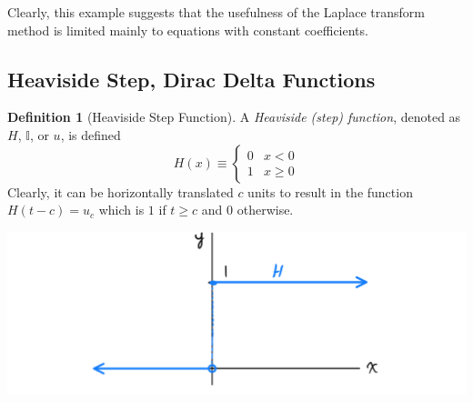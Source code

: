 \documentclass{article}
\theoremstyle{remark}
\theoremstyle{definition}
\newtheorem{definition}{Definition}[section]
\begin{document}
      Clearly, this example suggests that the usefulness of the Laplace transform method is limited mainly to equations with constant coefficients. 

  \subsection{Heaviside Step, Dirac Delta Functions}

    \begin{definition}[Heaviside Step Function]
    A \textit{Heaviside (step) function}, denoted as $H$, $\mathbb{I}$, or $u$, is defined
    \[H(x) \equiv \begin{cases}
    0 & x < 0 \\
    1  & x \geq 0
    \end{cases}\]
    Clearly, it can be horizontally translated $c$ units to result in the function $H(t-c) = u_c$ which is $1$ if $t \geq c$ and $0$ otherwise. 
    \begin{center}
        \includegraphics[scale=0.23]{img/Heaviside.PNG}
    \end{center}
    \end{definition} 
\end{document}

